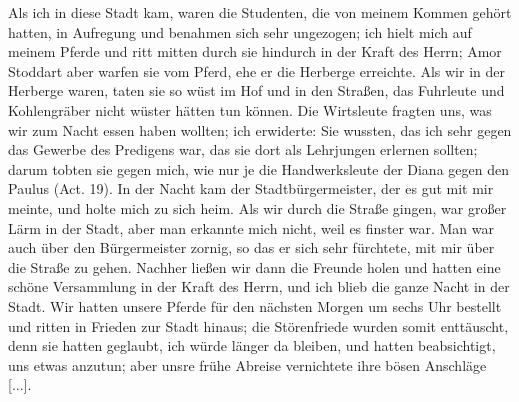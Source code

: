 Als ich in diese Stadt kam, waren die 
Studenten, die von
meinem Kommen gehört hatten, in Aufregung und benahmen
sich sehr ungezogen; ich hielt mich auf meinem Pferde und ritt
mitten durch sie hindurch in der Kraft des Herrn; 
Amor Stoddart
aber warfen sie vom Pferd, ehe er die Herberge erreichte. Als
wir in der Herberge waren, taten sie so wüst im Hof und in den
Straßen, das Fuhrleute und Kohlengräber nicht wüster hätten
tun können. Die Wirtsleute fragten uns, was wir zum Nacht
essen haben wollten; ich erwiderte:  Sie
wussten, das ich sehr gegen das Gewerbe des 
Predigens war, das
sie dort als Lehrjungen erlernen sollten; darum tobten sie gegen
mich, wie nur je die Handwerksleute der Diana gegen den Paulus
(Act. 19). In der Nacht kam der 
Stadtbürgermeister, der es gut mit mir meinte, und 
holte mich zu sich heim. Als wir durch
die Straße gingen, war großer Lärm in der Stadt, aber man
erkannte mich nicht, weil es finster war. Man war auch über
den Bürgermeister zornig, so das er sich sehr fürchtete, mit mir
über die Straße zu gehen. Nachher ließen wir dann die Freunde
holen und hatten eine schöne Versammlung in der Kraft des
Herrn, und ich blieb die ganze Nacht in der Stadt. Wir hatten
unsere Pferde für den nächsten Morgen um sechs Uhr bestellt
und ritten in Frieden zur Stadt hinaus; die Störenfriede wurden
somit enttäuscht, denn sie hatten geglaubt, ich würde länger da
bleiben, und hatten beabsichtigt, uns etwas anzutun; aber unsre
frühe Abreise vernichtete ihre bösen Anschläge [...].

\section{}


